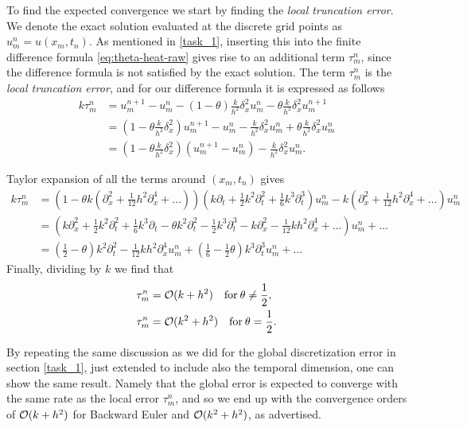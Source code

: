 To find the expected convergence we start by finding the \textit{local truncation error}. 
We denote the exact solution evaluated at the discrete grid points as $u_m^n = u(x_m, t_n)$. 
As mentioned in \ref{task_1}, 
inserting this into the finite difference formula \eqref{eq:theta-heat-raw} gives rise to an additional term $\tau_m^n$, 
since the difference formula is not satisfied by the exact solution. 
The term $\tau_m^n$ is the \textit{local truncation error}, 
and for our difference formula it is expressed as follows 
\begin{align*}
    k\tau_m^n & = u_m^{n+1} - u_m^n - (1-\theta)\frac{k}{h^2}\delta_x^2 u_m^n - \theta\frac{k}{h^2}\delta_x^2 u_m^{n+1}\\
    & = (1 - \theta\frac{k}{h^2}\delta_x^2)u_m^{n+1} - u_m^n-\frac{k}{h^2}\delta_x^2 u_m^n + \theta\frac{k}{h^2}\delta_x^2u_m^n\\
    & = (1 - \theta\frac{k}{h^2}\delta_x^2)(u_m^{n+1} - u_m^n) - \frac{k}{h^2}\delta_x^2 u_m^n.
\end{align*}

Taylor expansion of all the terms around $(x_m, t_n)$ gives
\begin{align*}
    k\tau_m^n & = \left(1-\theta k(\partial_x^2+\frac{1}{12}h^2\partial_x^4+\dots) \right)
    \left(k\partial_t+\frac{1}{2}k^2\partial_t^2+\frac{1}{6}k^3\partial_t^3\right)u_m^n
    -k\left(\partial_x^2+\frac{1}{12}h^2\partial_x^4+\dots\right)u_m^n\\
    & = \left(k\partial_x^2+\frac{1}{2}k^2\partial_t^2+\frac{1}{6}k^3\partial_t
    -\theta k^2 \partial_t^2 - \frac{1}{2} k^3 \partial_t^3 - k \partial_x^2 - \frac{1}{12} kh^2 \partial_x^4 + \dots \right)u_m^n + \dots\\
    & = \left(\frac{1}{2}-\theta\right)k^2\partial_t^2-\frac{1}{12}kh^2\partial_x^4u_m^n+\left(\frac{1}{6}-\frac{1}{2}\theta\right)k^3\partial_t^3u_m^n+\dots
\end{align*}
Finally, dividing by $k$ we find that 
\begin{align*}
    \tau_m^n & = \mathcal{O}(k+h^2) \quad \text{for} \: \theta\neq\frac{1}{2},\\
    \tau_m^n & = \mathcal{O}(k^2+h^2) \quad \text{for} \: \theta = \frac{1}{2}.
\end{align*}

By repeating the same discussion as we did for the global discretization error in section \ref{task_1}, 
just extended to include also the temporal dimension, 
one can show the same result. 
Namely that the global error is expected to converge with the same rate as the local error $\tau_m^n$, 
and so we end up with the convergence orders of $\mathcal{O}(k+h^2)$ for Backward Euler and $\mathcal{O}(k^2+h^2)$, 
as advertised. 


